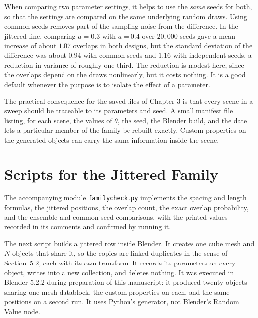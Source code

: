 When comparing two parameter settings, it helps to use the \emph{same} seeds for both, so that the settings are compared on the same underlying random draws. Using common seeds removes part of the sampling noise from the difference. In the jittered line, comparing $a=0.3$ with $a=0.4$ over $20{,}000$ seeds gave a mean increase of about $1.07$ overlaps in both designs, but the standard deviation of the difference was about $0.94$ with common seeds and $1.16$ with independent seeds, a reduction in variance of roughly one third. The reduction is modest here, since the overlaps depend on the draws nonlinearly, but it costs nothing. It is a good default whenever the purpose is to isolate the effect of a parameter.

The practical consequence for the saved files of Chapter 3 is that every scene in a sweep should be traceable to its parameters and seed. A small manifest file listing, for each scene, the values of $\theta$, the seed, the Blender build, and the date lets a particular member of the family be rebuilt exactly. Custom properties on the generated objects can carry the same information inside the scene.

\section{Scripts for the Jittered Family}

The accompanying module \texttt{familycheck.py} implements the spacing and length formulas, the jittered positions, the overlap count, the exact overlap probability, and the ensemble and common-seed comparisons, with the printed values recorded in its comments and confirmed by running it.



The next script builds a jittered row inside Blender. It creates one cube mesh and $N$ objects that share it, so the copies are linked duplicates in the sense of Section~5.2, each with its own transform. It records its parameters on every object, writes into a new collection, and deletes nothing. It was executed in Blender 5.2.2 during preparation of this manuscript: it produced twenty objects sharing one mesh datablock, the custom properties on each, and the same positions on a second run. It uses Python's generator, not Blender's Random Value node.

